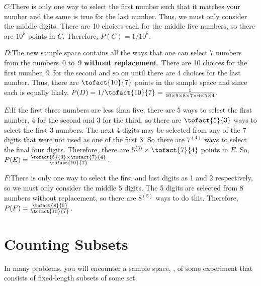 \begin{example}
\par\smallskip
$C$:\hspace{5mm}There is only one way to select the first number such that it matches your number and the same is true for the last number. Thus, we must only consider the middle digits. There are 10 choices each for the middle five numbers, so there are $10^5$ points in $C$. Therefore, $P(C) = 1/10^5$.
\par\medskip
$D$:\hspace{5mm}The new sample space contains all the ways that one can select 7 numbers from the numbers~0 to~9 \textbf{without replacement}. There are 10 choices for the first number, 9~for the second and so on until there are 4 choices for the last number. Thus, there are $\tofact{10}{7}$ points in the sample space and since each is equally likely, $P(D) = 1/\tofact{10}{7} = \frac{1}{10 \times 9 \times 8 \times 7 \times 6 \times 5 \times 4}$.
\par\smallskip
$E$:\hspace{5mm}If the first three numbers are less than five, there are 5 ways to select the first number, 4 for the second and 3 for the third, so there are $\tofact{5}{3}$ ways to select the first 3 numbers. The next 4 digits may be selected from any of the 7 digits that were not used as one of the first 3. So there are $7^{(4)}$ ways to select the final four digits. Therefore, there are $5^{(3)} \times \tofact{7}{4}$ points in $E$. So, $P(E) = \frac{\tofact{5}{3} \times \tofact{7}{4}}{\tofact{10}{7}}$.
\par\smallskip
$F$:\hspace{5mm}There is only one way to select the first and last digits as 1 and 2 respectively, so we must only consider the middle 5 digits. The 5 digits are selected from 8 numbers without replacement, so there are $8^{(5)}$ ways to do this. Therefore, $P(F) = \frac{\tofact{8}{5}}{\tofact{10}{7}}$.
\end{example}
\section{Counting Subsets}
In many problems, you will encounter a sample space, \sS, of some experiment that consists of fixed-length subsets of some set.
